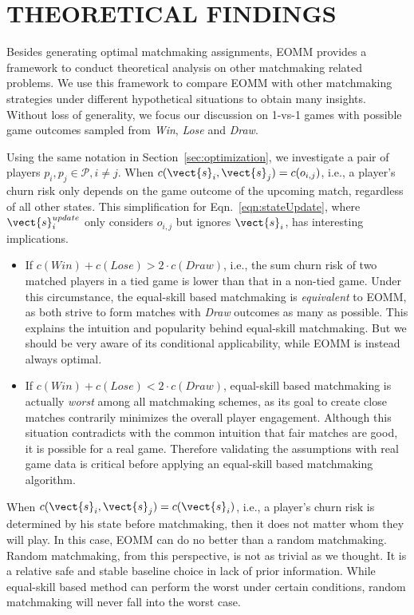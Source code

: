 \vspace{3mm}

\section{THEORETICAL FINDINGS}\label{sec:findings}
Besides generating optimal matchmaking assignments, EOMM provides a framework to conduct theoretical analysis on other matchmaking related problems. We use this framework to compare EOMM with other matchmaking strategies under different hypothetical situations to obtain many insights. Without loss of generality, we focus our discussion on 1-vs-1 games with possible game outcomes sampled from \emph{Win}, \emph{Lose} and \emph{Draw}.

Using the same notation in Section~\ref{sec:optimization}, we investigate a pair of players $p_i, p_j \in \mathcal{P}, i \neq j$. When $c(\vect{s}_i, \vect{s}_j) = c(o_{i,j})$, i.e., a player's churn risk only depends on the game outcome of the upcoming match, regardless of all other states. This simplification for Eqn.~\ref{eqn:stateUpdate}, where $\vect{s}_i^{update}$ only considers $o_{i,j}$ but ignores $\vect{s}_i$, has  interesting implications.
\begin{itemize}
\item If $c(Win)+c(Lose) > 2\cdot c(Draw)$, i.e., the sum churn risk of two matched players in a tied game is lower than that in a non-tied game. Under this circumstance, the equal-skill based matchmaking is \emph{equivalent} to EOMM, as both strive to form matches with \emph{Draw} outcomes as many as possible. This explains the intuition and popularity behind equal-skill matchmaking. But we should be very aware of its conditional applicability, while EOMM is instead always optimal.
\item If $c(Win) + c(Lose)< 2\cdot c(Draw)$, equal-skill based matchmaking is actually \emph{worst} among all matchmaking schemes, as its goal to create close matches contrarily minimizes the overall player engagement. Although this situation contradicts with the common intuition that fair matches are good, it is possible for a real game. Therefore validating the assumptions with real game data is critical before applying an equal-skill based matchmaking algorithm.
\end{itemize}

When $c(\vect{s}_i, \vect{s}_j) = c(\vect{s}_i)$, i.e., a player's churn risk is determined by his state before matchmaking, then it does not matter whom they will play. In this case, EOMM can do no better than a random matchmaking. Random matchmaking, from this perspective, is not as trivial as we thought. It is a relative safe and stable baseline choice in lack of prior information. While equal-skill based method can perform the worst under certain conditions, random matchmaking will never fall into the worst case.

